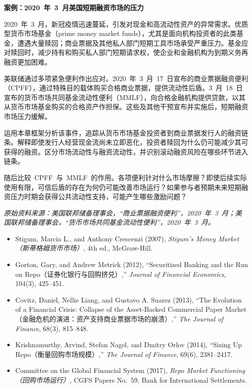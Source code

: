 
\textbf{案例：2020~年~3~月美国短期融资市场的压力}

2020~年~3~月，新冠疫情迅速蔓延，引发对现金和高流动性资产的异常需求。优质型货币市场基金（prime money market funds），尤其是面向机构投资者的此类基金，遭遇大量赎回；商业票据及其他私人部门短期工具市场承受严重压力。基金应对赎回时，减少持有和购买私人部门短期请求权，使企业和金融机构为到期义务再融资更加困难。

美联储通过多项紧急便利作出应对。2020~年~3~月~17~日宣布的商业票据融资便利（CPFF），通过特殊目的载体购买合格商业票据，提供流动性后盾。3~月~18~日宣布的货币市场共同基金流动性便利（MMLF），向合格金融机构提供贷款，以其从货币市场基金购买的合格资产作担保。这些及其他干预宣布并实施后，短期融资市场压力缓解。

运用本章框架分析该事件，追踪从货币市场基金投资者到商业票据发行人的融资链条。解释即使发行人经营现金流尚未立即恶化，投资者赎回为什么仍可能减少其可获得的融资。区分市场流动性与融资流动性，并识别滚动融资风险在哪些环节进入链条。

随后比较~CPFF~与~MMLF~的作用。各项便利针对什么市场摩擦？即使后续实际使用有限，可信后盾的存在为何仍可能改善市场运行？如果参与者预期未来短期融资压力时期会获得公共流动性支持，可能产生哪些激励问题？

\emph{原始资料来源：美国联邦储备理事会，“商业票据融资便利”，2020~年~3~月；美国联邦储备理事会，“货币市场共同基金流动性便利”，2020~年~3~月。}



\begin{itemize}

\item Stigum, Marcia L., and Anthony Crescenzi (2007),
\emph{Stigum's Money Market（斯蒂格姆货币市场）}, 4th ed., McGraw-Hill.

\item Gorton, Gary, and Andrew Metrick (2012),
``Securitized Banking and the Run on Repo（证券化银行与回购挤兑）,''
\emph{Journal of Financial Economics}, 104(3), 425--451.

\item Covitz, Daniel, Nellie Liang, and Gustavo A. Suarez (2013),
``The Evolution of a Financial Crisis: Collapse of the Asset-Backed Commercial Paper Market（金融危机的演进：资产支持商业票据市场的崩溃）,''
\emph{The Journal of Finance}, 68(3), 815--848.

\item Krishnamurthy, Arvind, Stefan Nagel, and Dmitry Orlov (2014),
``Sizing Up Repo（衡量回购市场规模）,''
\emph{The Journal of Finance}, 69(6), 2381--2417.

\item Committee on the Global Financial System (2017),
\emph{Repo Market Functioning（回购市场运行）},
CGFS Papers No.~59, Bank for International Settlements.

\end{itemize}

